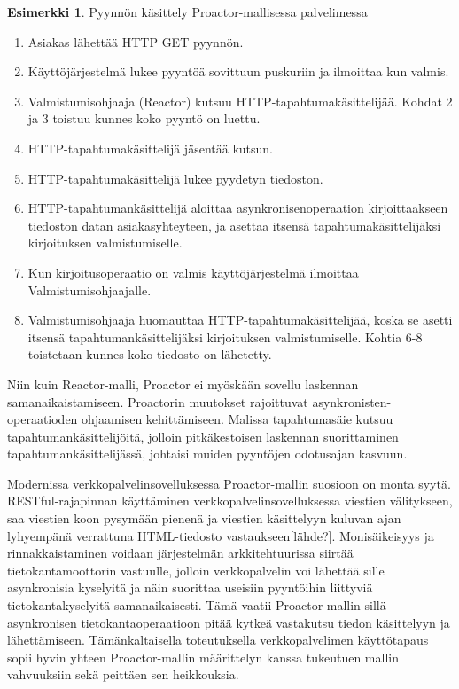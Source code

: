 \documentclass[finnish]{tktltiki2}
\theoremstyle{definition}
\newtheorem{esim}[lau]{Esimerkki}
\theoremstyle{remark}
\begin{document}
    \begin{esim}\label{esim:proactor}
        Pyynnön käsittely Proactor-mallisessa palvelimessa~\cite{pyarali_proactor_1997} \\
        \begin{enumerate}
            \item Asiakas lähettää HTTP GET pyynnön.
            \item Käyttöjärjestelmä lukee pyyntöä sovittuun puskuriin ja ilmoittaa kun valmis.
            \item Valmistumisohjaaja (Reactor) kutsuu HTTP-tapahtumakäsittelijää.
                Kohdat 2 ja 3 toistuu kunnes koko pyyntö on luettu.
            \item HTTP-tapahtumakäsittelijä jäsentää kutsun.
            \item HTTP-tapahtumakäsittelijä lukee pyydetyn tiedoston.
            \item HTTP-tapahtumankäsittelijä aloittaa asynkronisenoperaation 
                kirjoittaakseen tiedoston datan asiakasyhteyteen, ja asettaa
                itsensä tapahtumakäsittelijäksi kirjoituksen valmistumiselle.
            \item Kun kirjoitusoperaatio on valmis käyttöjärjestelmä ilmoittaa
                Valmistumisohjaajalle.
            \item Valmistumisohjaaja huomauttaa HTTP-tapahtumakäsittelijää,
                koska se asetti itsensä tapahtumankäsittelijäksi kirjoituksen 
                valmistumiselle. Kohtia 6-8 toistetaan kunnes koko tiedosto on lähetetty. 
        \end{enumerate}
    \end{esim}

Niin kuin Reactor-malli, Proactor ei myöskään sovellu laskennan samanaikaistamiseen.
Proactorin muutokset rajoittuvat asynkronisten-operaatioden ohjaamisen 
kehittämiseen. Malissa tapahtumasäie kutsuu tapahtumankäsittelijöitä, jolloin
pitkäkestoisen laskennan suorittaminen tapahtumankäsittelijässä, johtaisi
muiden pyyntöjen odotusajan kasvuun.

Modernissa verkkopalvelinsovelluksessa Proactor-mallin suosioon on
monta syytä. RESTful-rajapinnan käyttäminen
verkkopalvelinsovelluksessa viestien välitykseen,
saa viestien koon pysymään pienenä ja viestien
käsittelyyn kuluvan ajan lyhyempänä verrattuna
HTML-tiedosto vastaukseen[lähde?]. %
Monisäikeisyys ja rinnakkaistaminen
voidaan järjestelmän arkkitehtuurissa siirtää tietokantamoottorin vastuulle,
jolloin verkkopalvelin voi lähettää sille asynkronisia kyselyitä
ja näin suorittaa useisiin pyyntöihin liittyviä tietokantakyselyitä
samanaikaisesti. Tämä vaatii Proactor-mallin sillä asynkronisen tietokantaoperaatioon
pitää kytkeä vastakutsu tiedon käsittelyyn ja lähettämiseen.
Tämänkaltaisella toteutuksella verkkopalvelimen käyttötapaus sopii
hyvin yhteen Proactor-mallin määrittelyn kanssa tukeutuen
mallin vahvuuksiin sekä peittäen sen heikkouksia.
\end{document}
